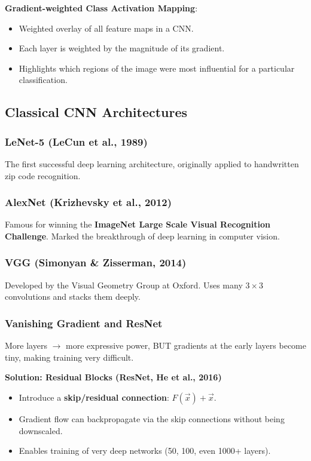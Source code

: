 \documentclass[11pt,a4paper]{article}
\newcommand{\vx}{\vec{x}}
\begin{document}
\textbf{Gradient-weighted Class Activation Mapping}:
\begin{itemize}[leftmargin=*]
    \item Weighted overlay of all feature maps in a CNN.
    \item Each layer is weighted by the magnitude of its gradient.
    \item Highlights which regions of the image were most influential for a particular classification.
\end{itemize}

\subsection{Classical CNN Architectures}

\subsubsection{LeNet-5 (LeCun et al., 1989)}

The first successful deep learning architecture, originally applied to handwritten zip code recognition.

\subsubsection{AlexNet (Krizhevsky et al., 2012)}

Famous for winning the \textbf{ImageNet Large Scale Visual Recognition Challenge}. Marked the breakthrough of deep learning in computer vision.

\subsubsection{VGG (Simonyan \& Zisserman, 2014)}

Developed by the Visual Geometry Group at Oxford. Uses many $3\times3$ convolutions and stacks them deeply.

\subsubsection{Vanishing Gradient and ResNet}

\begin{warningbox}[title=Vanishing Gradient Problem]
More layers $\to$ more expressive power, BUT gradients at the early layers become tiny, making training very difficult.
\end{warningbox}

\textbf{Solution: Residual Blocks (ResNet, He et al., 2016)}
\begin{itemize}[leftmargin=*]
    \item Introduce a \textbf{skip/residual connection}: $F(\vx) + \vx$.
    \item Gradient flow can backpropagate via the skip connections without being downscaled.
    \item Enables training of very deep networks (50, 100, even 1000+ layers).
\end{itemize}
\end{document}
